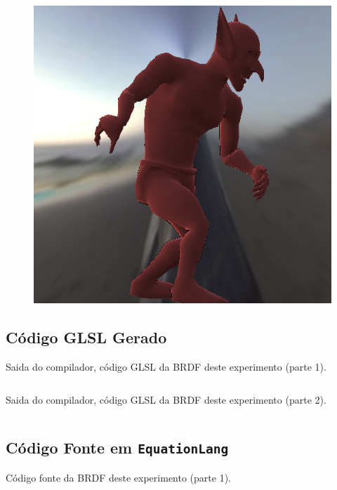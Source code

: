 \begin{figure}[H]
\endminipage\hfill
{}%
  \includegraphics[width=\linewidth]{./Imagens/brdfs/minnaert-goblin.png}
\endminipage
\end{figure}

\subsection{Código GLSL Gerado}
\begin{codigo}[H]
    \caption{\small Saida do compilador, código GLSL da BRDF deste experimento (parte 1). }
    \label{cod-minnaert-eqlang-declarations}
\begin{lstlisting}[language=C, inputencoding=utf8]
\end{lstlisting}
\end{codigo}

\begin{codigo}[H]
    \caption{\small Saida do compilador, código GLSL da BRDF deste experimento  (parte 2). }
    \label{cod-minnaert-eqlang}
\begin{lstlisting}[language=C, inputencoding=utf8]
\end{lstlisting}
\end{codigo}

\subsection{Código Fonte em \texttt{EquationLang}}
\begin{codigo}[H]
    \caption{\small Código fonte da BRDF deste experimento (parte 1).}
    \label{cod-minnaert-eqlang}
\begin{lstlisting}[language=tex, frame=none, inputencoding=utf8]
\end{lstlisting}
\end{codigo}
